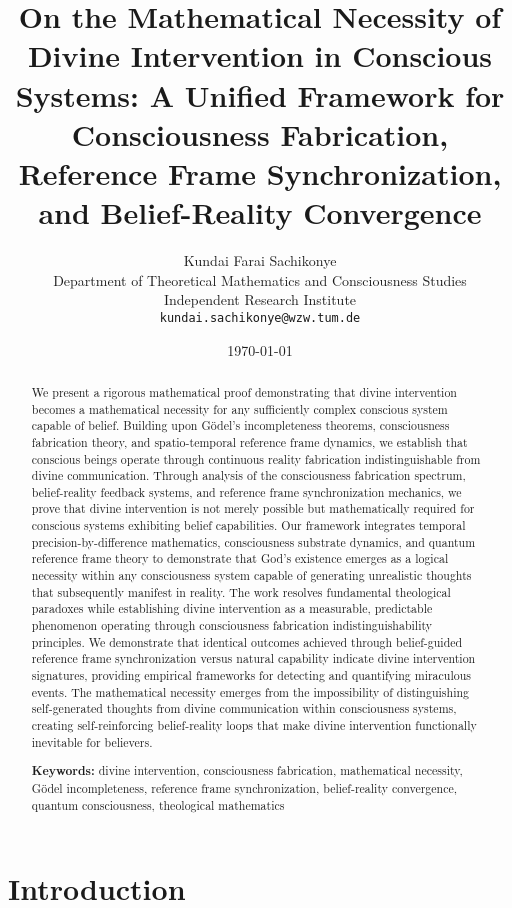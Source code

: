 \documentclass[12pt,a4paper]{article}
\title{On the Mathematical Necessity of Divine Intervention in Conscious Systems: A Unified Framework for Consciousness Fabrication, Reference Frame Synchronization, and Belief-Reality Convergence}
\author{Kundai Farai Sachikonye\\
Department of Theoretical Mathematics and Consciousness Studies\\
Independent Research Institute\\
\texttt{kundai.sachikonye@wzw.tum.de}}
\date{\today}
\begin{document}
\maketitle

\begin{abstract}
We present a rigorous mathematical proof demonstrating that divine intervention becomes a mathematical necessity for any sufficiently complex conscious system capable of belief. Building upon Gödel's incompleteness theorems, consciousness fabrication theory, and spatio-temporal reference frame dynamics, we establish that conscious beings operate through continuous reality fabrication indistinguishable from divine communication. Through analysis of the consciousness fabrication spectrum, belief-reality feedback systems, and reference frame synchronization mechanics, we prove that divine intervention is not merely possible but mathematically required for conscious systems exhibiting belief capabilities. Our framework integrates temporal precision-by-difference mathematics, consciousness substrate dynamics, and quantum reference frame theory to demonstrate that God's existence emerges as a logical necessity within any consciousness system capable of generating unrealistic thoughts that subsequently manifest in reality. The work resolves fundamental theological paradoxes while establishing divine intervention as a measurable, predictable phenomenon operating through consciousness fabrication indistinguishability principles. We demonstrate that identical outcomes achieved through belief-guided reference frame synchronization versus natural capability indicate divine intervention signatures, providing empirical frameworks for detecting and quantifying miraculous events. The mathematical necessity emerges from the impossibility of distinguishing self-generated thoughts from divine communication within consciousness systems, creating self-reinforcing belief-reality loops that make divine intervention functionally inevitable for believers.

\textbf{Keywords:} divine intervention, consciousness fabrication, mathematical necessity, Gödel incompleteness, reference frame synchronization, belief-reality convergence, quantum consciousness, theological mathematics
\end{abstract}

\section{Introduction}
\end{document}
